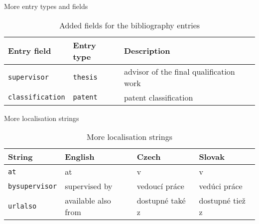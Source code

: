\documentclass{beamer}
\begin{document}
\begin{frame}{More entry types and fields}
\begin{table}[!htbp]
\begin{tabularx}{\textwidth}{llX}
  \textbf{Entry field} & \textbf{Entry type} & \textbf{Description}\\
  \midrule
  \texttt{supervisor}     & \texttt{thesis} & advisor of the final qualification work\\
  \texttt{classification} & \texttt{patent} & patent classification\\
  \bottomrule
\end{tabularx}
\caption{Added fields for the bibliography entries}
\label{tab:newfields}
\end{table}
\end{frame}

\begin{frame}{More localisation strings}
\begin{table}[!htbp]
\begin{tabularx}{\textwidth}{lXXX}
  \textbf{String} & \textbf{English} & \textbf{Czech} & \textbf{Slovak}\\
  \midrule
  \texttt{at}           & {at} & {v} & {v}\\
  \texttt{bysupervisor} & {supervised by} & {vedouc\'{i} pr\'{a}ce} & {ved\'{u}ci pr\'{a}ce}\\
  \texttt{urlalso}      & {available also from} & {dostupn\'{e} tak\'{e} z} & {dostupn\'{e} tie\v{z} z}\\
  \bottomrule
\end{tabularx}
\caption{More localisation strings}
\label{tab:newl10n}
\end{table}
\end{frame}
\end{document}
